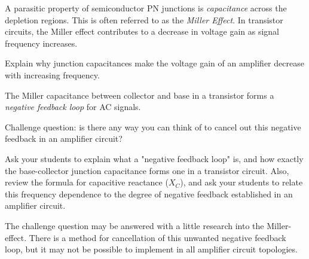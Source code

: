 

A parasitic property of semiconductor PN junctions is {\it capacitance} across the depletion regions.  This is often referred to as the {\it Miller Effect}.  In transistor circuits, the Miller effect contributes to a decrease in voltage gain as signal frequency increases.

Explain why junction capacitances make the voltage gain of an amplifier decrease with increasing frequency.







The Miller capacitance between collector and base in a transistor forms a {\it negative feedback loop} for AC signals.

\vskip 10pt

Challenge question: is there any way you can think of to cancel out this negative feedback in an amplifier circuit?







Ask your students to explain what a "negative feedback loop" is, and how exactly the base-collector junction capacitance forms one in a transistor circuit.  Also, review the formula for capacitive reactance ($X_C$), and ask your students to relate this frequency dependence to the degree of negative feedback established in an amplifier circuit.

The challenge question may be answered with a little research into the Miller-effect.  There is a method for cancellation of this unwanted negative feedback loop, but it may not be possible to implement in all amplifier circuit topologies.





